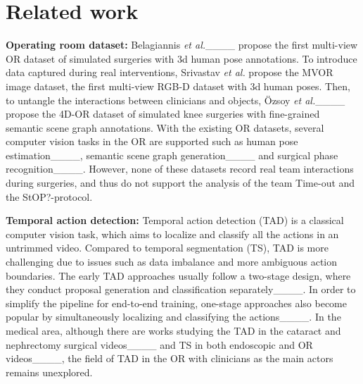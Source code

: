 \section{Related work}
\label{related}

\noindent \textbf{Operating room dataset: } Belagiannis \textit{et al.}____ propose the first multi-view OR dataset of simulated surgeries with 3d human pose annotations. To introduce data captured during real interventions, Srivastav \textit{et al.} propose the MVOR image dataset, the first multi-view RGB-D dataset with 3d human poses. Then, to untangle the interactions between clinicians and objects, Özsoy \textit{et al.}____ propose the 4D-OR dataset of simulated knee surgeries with fine-grained semantic scene graph annotations. With the existing OR datasets, several computer vision tasks in the OR are supported such as human pose estimation____, semantic scene graph generation____ and surgical phase recognition____. However, none of these datasets record real team interactions during surgeries, and thus do not support the analysis of the team Time-out and the StOP?-protocol.


\noindent \textbf{Temporal action detection: } Temporal action detection (TAD) is a classical computer vision task, which aims to localize and classify all the actions in an untrimmed video. Compared to temporal segmentation (TS), TAD is more challenging due to issues such as data imbalance and more ambiguous action boundaries. The early TAD approaches usually follow a two-stage design, where they conduct proposal generation and classification separately____. In order to simplify the pipeline for end-to-end training, one-stage approaches also become popular by simultaneously localizing and classifying the actions____. In the medical area, although there are works studying the TAD in the cataract and nephrectomy surgical videos____ and TS in both endoscopic and OR videos____, the field of TAD in the OR with clinicians as the main actors remains unexplored.